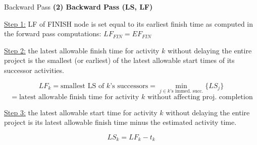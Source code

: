 \documentclass[11pt,aspectratio=169]{beamer}
\begin{document}
\begin{frame}{Backward Pass}
    \textbf{(2) Backward Pass (LS, LF)}
    \vspace{0.5em}
    
    \underline{Step 1:} LF of FINISH node is set equal to its earliest finish time as computed in the forward pass computations: $LF_{FIN} = EF_{FIN}$
    
    \vspace{1em}
    \underline{Step 2:} the latest allowable finish time for activity $k$ without delaying the entire project is the smallest (or earliest) of the latest allowable start times of its successor activities.
    
    $$LF_k = \text{smallest LS of } k\text{'s successors} = \min_{j \in k\text{'s immed. succ.}} \{LS_j\}$$
    $$= \text{latest allowable finish time for activity } k \text{ without affecting proj. completion}$$
    
    \vspace{1em}
    \underline{Step 3:} the latest allowable start time for activity $k$ without delaying the entire project is its latest allowable finish time minus the estimated activity time.
    
    $$LS_k = LF_k - t_k$$
\end{frame}
\end{document}
